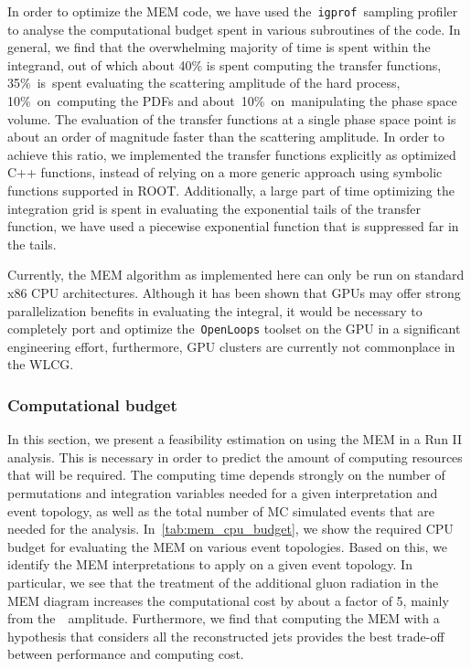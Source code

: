 In order to optimize the MEM code, we have used the~\texttt{igprof}~sampling profiler~\cite{Eulisse:2005zz,Tuura:2008zza} to analyse the computational budget spent in various subroutines of the code. In general, we find    
that the overwhelming majority of time is spent within the integrand, out of which about 40\% is spent computing the transfer functions, 35\%~is~spent evaluating the scattering amplitude of the hard process, 10\%~on~computing the PDFs and about~10\%~on~manipulating the phase space volume. The evaluation of the transfer functions at a single phase space point is about an order of magnitude faster than the scattering amplitude. In order to achieve this ratio, we implemented the transfer functions explicitly as optimized C++ functions, instead of relying on a more generic approach using symbolic functions supported in ROOT. Additionally, a large part of time optimizing the integration grid is spent in evaluating the exponential tails of the transfer function, we have used a piecewise exponential function that is suppressed far in the tails.

Currently, the MEM algorithm as implemented here can only be run on standard x86 CPU architectures. Although it has been shown that GPUs may offer strong parallelization benefits in evaluating the integral, it would be necessary to completely port and optimize the~\texttt{OpenLoops} toolset on the GPU in a significant engineering effort\cite{Schouten:2014yza}, furthermore, GPU clusters are currently not commonplace in the WLCG.

\subsubsection{Computational budget}
\label{sec:mem_computational}
In this section, we present a feasibility estimation on using the MEM in a Run II analysis. This is necessary in order to predict the amount of computing resources that will be required. The computing time depends strongly on the number of permutations and integration variables needed for a given interpretation and event topology, as well as the total number of MC simulated events that are needed for the analysis. In~\cref{tab:mem_cpu_budget}, we show the required CPU budget for evaluating the MEM on various event topologies. Based on this, we identify the MEM interpretations to apply on a given event topology. In particular, we see that the treatment of the additional gluon radiation in the MEM diagram increases the computational cost by about a factor of 5, mainly from the~\ttbb~amplitude. Furthermore, we find that computing the MEM with a hypothesis that considers all the reconstructed jets provides the best trade-off between performance and computing cost.

